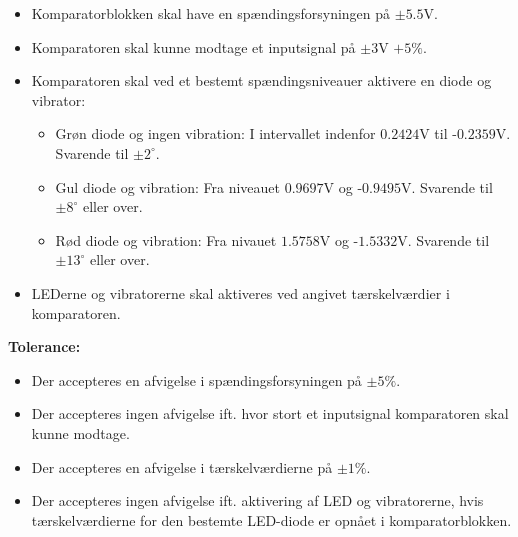 \begin{itemize}
	\item Komparatorblokken skal have en spændingsforsyningen på $\pm5.5$V.
	\item Komparatoren skal kunne modtage et inputsignal på $\pm3$V $+5\%$.
	\item Komparatoren skal ved et bestemt spændingsniveauer aktivere en diode og vibrator:
	\begin{itemize}
		\item Grøn diode og ingen vibration: I intervallet indenfor $0.2424$V til -$0.2359$V. Svarende til $\pm2^{\circ}$.
		\item Gul diode og vibration: Fra niveauet $0.9697$V og -$0.9495$V. Svarende til $\pm 8^{\circ}$ eller over.
		\item Rød diode og vibration: Fra nivauet $1.5758$V og -$1.5332$V. Svarende til $\pm13^{\circ}$ eller over.
	\end{itemize}
	\item LEDerne og vibratorerne skal aktiveres ved angivet tærskelværdier i komparatoren.
\end{itemize}
\textbf{Tolerance:}
\begin{itemize}
	\item Der accepteres en afvigelse i spændingsforsyningen på $\pm5\%$.
	\item Der accepteres ingen afvigelse ift. hvor stort et inputsignal komparatoren skal kunne modtage.
	\item Der accepteres en afvigelse i tærskelværdierne på $\pm1\%$.
	\item Der accepteres ingen afvigelse ift. aktivering af LED og vibratorerne, hvis tærskelværdierne for den bestemte LED-diode er opnået i komparatorblokken.
\end{itemize}
